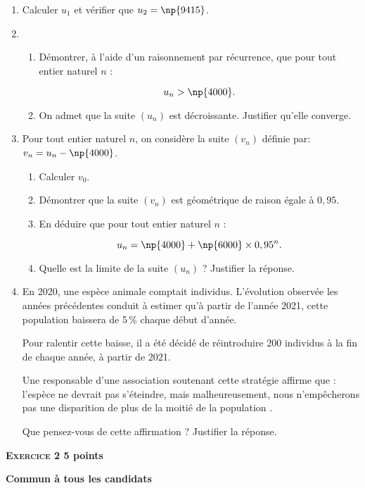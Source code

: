 \documentclass[11pt]{article}
\begin{document}
\begin{enumerate}
\item Calculer $u_1$ et vérifier que $u_2 = \np{9415}$. 
\item 
	\begin{enumerate}
		\item Démontrer, à l'aide d'un raisonnement par récurrence, que pour tout entier naturel $n$ :

\[u_n > \np{4000}.\]

		\item On admet que la suite $\left(u_n\right)$ est décroissante. Justifier qu'elle converge.
	\end{enumerate}
\item  Pour tout entier naturel $n$, on considère la suite $\left(v_n\right)$ définie par: $v_n = u_n - \np{4000}$.
	\begin{enumerate}
		\item Calculer $v_0$.
		\item Démontrer que la suite $\left(v_n\right)$ est géométrique de raison égale à $0,95$.
		\item En déduire que pour tout entier naturel $n$ :

\[u_n = \np{4000} + \np{6000} \times 0,95^n.\]

		\item Quelle est la limite de la suite $\left(u_n\right)$ ? Justifier la réponse.
	\end{enumerate}
\item En 2020, une espèce animale comptait  individus. L'évolution observée les années précédentes conduit à estimer qu'à partir de l'année 2021, cette population baissera de 5\,\% chaque début d'année.

Pour ralentir cette baisse, il a été décidé de réintroduire $200$ individus à la fin de chaque année, à partir de 2021.

Une responsable d'une association soutenant cette stratégie affirme que : \og l'espèce ne devrait pas s'éteindre, mais malheureusement, nous n'empêcherons pas une disparition de plus de la moitié de la population \fg.

Que pensez-vous de cette affirmation ? Justifier la réponse.
\end{enumerate}

\bigskip

\textbf{\textsc{Exercice 2} \hfill 5 points}

\textbf{Commun à tous les candidats}

\medskip
\end{document}
